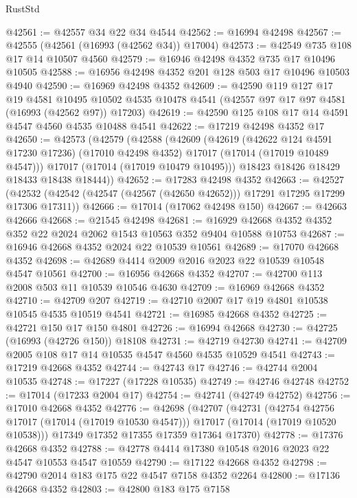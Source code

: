 \begin{lexlean}{RustStd}
\begin{coremodule}
@42561 := @42557 @34 @22 @34 @4544
@42562 := @16994 @42498
@42567 := @42555 (@42561 (@16993 (@42562 @34)) @17004)
@42573 := @42549 @735 @108 @17 @14 @10507 @4560
@42579 := @16946 @42498 @4352 @735 @17 @10496 @10505
@42588 := @16956 @42498 @4352 @201 @128 @503 @17 @10496 @10503 @4940
@42590 := @16969 @42498 @4352
@42609 := @42590
    @119
    @127
    @17
    @19
    @4581
    @10495
    @10502
    @4535
    @10478
    @4541
    (@42557 @97 @17 @97 @4581 (@16993 (@42562 @97)) @17203)
@42619 := @42590 @125 @108 @17 @14 @4591 @4547 @4560 @4535 @10488 @4541
@42622 := @17219 @42498 @4352 @17
@42650 := @42573
    (@42579
      (@42588
        (@42609
          (@42619
            (@42622 @124 @4591 @17230 @17236)
            (@17010 @42498 @4352)
            @17017
            (@17014 (@17019 @10489 @4547)))
          @17017
          (@17014 (@17019 @10479 @10495)))
        @18423
        @18426
        @18429
        @18433
        @18438
        @18444))
@42652 := @17283 @42498 @4352
@42663 := @42527
    (@42532 (@42542 (@42547 (@42567 (@42650 @42652))) @17291 @17295 @17299 @17306 @17311))
@42666 := @17014 (@17062 @42498 @150)
@42667 := @42663 @42666
@42668 := @21545 @42498
@42681 := @16929 @42668 @4352 @4352 @352 @22 @2024 @2062 @1543 @10563 @352 @9404 @10588 @10753
@42687 := @16946 @42668 @4352 @2024 @22 @10539 @10561
@42689 := @17070 @42668 @4352
@42698 := @42689 @4414 @2009 @2016 @2023 @22 @10539 @10548 @4547 @10561
@42700 := @16956 @42668 @4352
@42707 := @42700 @113 @2008 @503 @11 @10539 @10546 @4630
@42709 := @16969 @42668 @4352
@42710 := @42709 @207
@42719 := @42710 @2007 @17 @19 @4801 @10538 @10545 @4535 @10519 @4541
@42721 := @16985 @42668 @4352
@42725 := @42721 @150 @17 @150 @4801
@42726 := @16994 @42668
@42730 := @42725 (@16993 (@42726 @150)) @18108
@42731 := @42719 @42730
@42741 := @42709 @2005 @108 @17 @14 @10535 @4547 @4560 @4535 @10529 @4541
@42743 := @17219 @42668 @4352
@42744 := @42743 @17
@42746 := @42744 @2004 @10535
@42748 := @17227 (@17228 @10535)
@42749 := @42746 @42748
@42752 := @17014 (@17233 @2004 @17)
@42754 := @42741 (@42749 @42752)
@42756 := @17010 @42668 @4352
@42776 := @42698
    (@42707
      (@42731
        (@42754 @42756 @17017 (@17014 (@17019 @10530 @4547)))
        @17017
        (@17014 (@17019 @10520 @10538)))
      @17349
      @17352
      @17355
      @17359
      @17364
      @17370)
@42778 := @17376 @42668 @4352
@42788 := @42778 @4414 @17380 @10548 @2016 @2023 @22 @4547 @10553 @4547 @10559
@42790 := @17122 @42668 @4352
@42798 := @42790 @2014 @183 @175 @22 @4547 @7158 @4352 @2264
@42800 := @17136 @42668 @4352
@42803 := @42800 @183 @175 @7158

\end{coremodule}
\end{lexlean}
